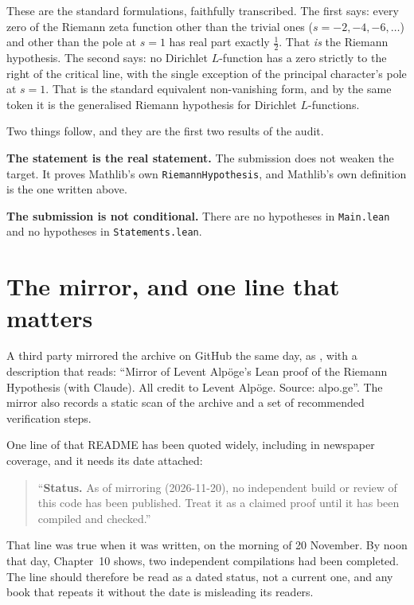 These are the standard formulations, faithfully transcribed. The first says:
every zero of the Riemann zeta function other than the trivial ones
($s = -2, -4, -6, \dots$) and other than the pole at $s = 1$ has real part
exactly $\tfrac12$. That \emph{is} the Riemann hypothesis. The second says: no
Dirichlet $L$-function has a zero strictly to the right of the critical line,
with the single exception of the principal character's pole at $s = 1$. That is
the standard equivalent non-vanishing form, and by the same token it is the
generalised Riemann hypothesis for Dirichlet $L$-functions.

Two things follow, and they are the first two results of the audit.

\begin{keytakeaways}

\item \textbf{The statement is the real statement.} The submission does not
weaken the target. It proves Mathlib's own \texttt{RiemannHypothesis}, and
Mathlib's own definition is the one written above.
\item \textbf{The submission is not conditional.} There are no hypotheses in
\texttt{Main.lean} and no hypotheses in \texttt{Statements.lean}.
\end{keytakeaways}

\section{The mirror, and one line that matters}A third party mirrored the archive on GitHub the same day, as
, with a description that reads:
``Mirror of Levent Alpöge's Lean proof of the Riemann Hypothesis (with Claude).
All credit to Levent Alpöge. Source: alpo.ge''. The mirror also records a
static scan of the archive and a set of recommended verification steps.

One line of that README has been quoted widely, including in newspaper
coverage, and it needs its date attached:

\begin{quote}
\small
``\textbf{Status.} As of mirroring (2026-11-20), no independent build or review
of this code has been published. Treat it as a claimed proof until it has been
compiled and checked.''
\end{quote}

That line was true when it was written, on the morning of 20 November. By noon
that day, Chapter~10 shows, two independent compilations had been completed.
The line should therefore be read as a dated status, not a current one, and any
book that repeats it without the date is misleading its readers.

